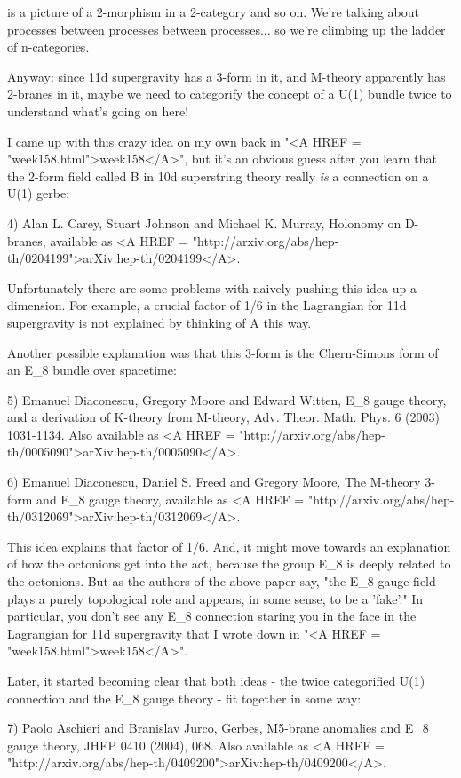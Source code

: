 is a picture of a 2-morphism in a 2-category and so on.  We're
talking about processes between processes between processes... 
so we're climbing up the ladder of n-categories.

Anyway: since 11d supergravity has a 3-form in it, and M-theory 
apparently has 2-branes in it, maybe we need to categorify 
the concept of a U(1) bundle twice to understand what's going
on here!

I came up with this crazy idea on my own back in "<A HREF =
"week158.html">week158</A>", but it's an obvious guess after you
learn that the 2-form field called B in 10d superstring theory really
\emph{is} a connection on a U(1) gerbe:

4) Alan L. Carey, Stuart Johnson and Michael K. Murray,
Holonomy on D-branes, available as <A HREF = "http://arxiv.org/abs/hep-th/0204199">arXiv:hep-th/0204199</A>.

Unfortunately there are some problems with naively pushing
this idea up a dimension.  For example, a crucial factor of 
1/6 in the Lagrangian for 11d supergravity is not explained 
by thinking of A this way.

Another possible explanation was that this 3-form is the 
Chern-Simons form of an E_{8} bundle over spacetime:

5) Emanuel Diaconescu, Gregory Moore and Edward Witten,
E_{8} gauge theory, and a derivation of K-theory from M-theory,
Adv. Theor. Math. Phys. 6 (2003) 1031-1134.  Also available as 
<A HREF = "http://arxiv.org/abs/hep-th/0005090">arXiv:hep-th/0005090</A>.

6) Emanuel Diaconescu, Daniel S. Freed and Gregory Moore,
The M-theory 3-form and E_{8} gauge theory, available as
<A HREF = "http://arxiv.org/abs/hep-th/0312069">arXiv:hep-th/0312069</A>.

This idea explains that factor of 1/6.  And, it might move towards an
explanation of how the octonions get into the act, because the group
E_{8} is deeply related to the octonions.  But as the authors
of the above paper say, "the E_{8} gauge field plays a
purely topological role and appears, in some sense, to be a
'fake'." In particular, you don't see any E_{8}
connection staring you in the face in the Lagrangian for 11d
supergravity that I wrote down in "<A HREF =
"week158.html">week158</A>".

Later, it started becoming clear that both ideas - the twice 
categorified U(1) connection and the E_{8} gauge theory - fit 
together in some way:

7) Paolo Aschieri and Branislav Jurco, Gerbes, M5-brane 
anomalies and E_{8} gauge theory, JHEP 0410 (2004), 068.
Also available as <A HREF = "http://arxiv.org/abs/hep-th/0409200">arXiv:hep-th/0409200</A>.

